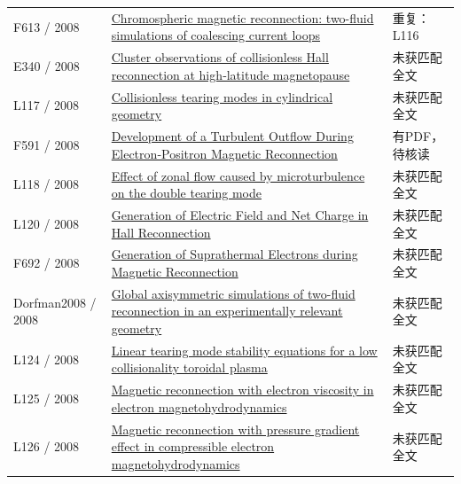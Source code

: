 \documentclass[UTF8,a4paper,11pt,openany,fontset=fandol]{ctexbook}
\begin{document}
\begin{longtable}{P{24mm}P{97mm}P{27mm}}
F613 / 2008 & \href{https://doi.org/10.1051/0004-6361:200809624}{Chromospheric magnetic reconnection: two-fluid simulations of coalescing current loops} & 重复：L116\\

E340 / 2008 & \href{https://doi.org/10.1029/2007ja012769}{Cluster observations of collisionless Hall reconnection at high‐latitude magnetopause} & 未获匹配全文\\

L117 / 2008 & \href{https://doi.org/10.1088/0741-3335/50/3/035005}{Collisionless tearing modes in cylindrical geometry} & 未获匹配全文\\

F591 / 2008 & \href{https://doi.org/10.1086/588088}{Development of a Turbulent Outflow During Electron‐Positron Magnetic Reconnection} & 有PDF，待核读\\

L118 / 2008 & \href{https://doi.org/10.1063/1.2969439}{Effect of zonal flow caused by microturbulence on the double tearing mode} & 未获匹配全文\\

L120 / 2008 & \href{https://doi.org/10.1088/0256-307x/25/8/055}{Generation of Electric Field and Net Charge in Hall Reconnection} & 未获匹配全文\\

F692 / 2008 & \href{http://citeseerx.ist.psu.edu/viewdoc/summary?doi=10.1.1.601.8469}{Generation of Suprathermal Electrons during Magnetic Reconnection} & 未获匹配全文\\

Dorfman2008 / 2008 & \href{https://doi.org/10.1063/1.2904600}{Global axisymmetric simulations of two-fluid reconnection in an experimentally relevant geometry} & 未获匹配全文\\

L124 / 2008 & \href{https://doi.org/10.1088/0741-3335/51/1/015009}{Linear tearing mode stability equations for a low collisionality toroidal plasma} & 未获匹配全文\\

L125 / 2008 & \href{https://doi.org/10.1063/1.2876622}{Magnetic reconnection with electron viscosity in electron magnetohydrodynamics} & 未获匹配全文\\

L126 / 2008 & \href{https://doi.org/10.1063/1.2895388}{Magnetic reconnection with pressure gradient effect in compressible electron magnetohydrodynamics} & 未获匹配全文\\


\end{longtable}
\end{document}
